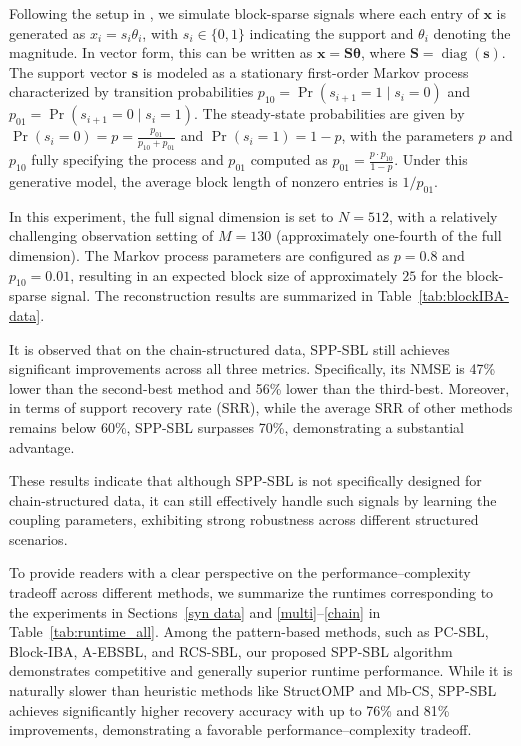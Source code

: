 \documentclass[lettersize,journal]{IEEEtran}
\theoremstyle{remark}
\begin{document}
Following the setup in \cite{korki2016iterative}, we simulate block-sparse signals where each entry of $\mathbf{x}$ is generated as $x_i = s_i \theta_i$, with $s_i \in \{0,1\}$ indicating the support and $\theta_i$ denoting the magnitude. In vector form, this can be written as $\mathbf{x} = \mathbf{S}\boldsymbol{\theta}$, where $\mathbf{S} = \operatorname{diag}(\mathbf{s})$. The support vector $\mathbf{s}$ is modeled as a stationary first-order Markov process characterized by transition probabilities $p_{10} = \Pr(s_{i+1}=1 \mid s_i=0)$ and $p_{01} = \Pr(s_{i+1}=0 \mid s_i=1)$. The steady-state probabilities are given by $\Pr(s_i=0) = p = \frac{p_{01}}{p_{10}+p_{01}}$ and $\Pr(s_i=1) = 1-p$, with the parameters $p$ and $p_{10}$ fully specifying the process and $p_{01}$ computed as $p_{01} = \frac{p \cdot p_{10}}{1-p}$.
Under this generative model, the average block length of nonzero entries is $1/p_{01}$. %

In this experiment, the full signal dimension is set to $N=512$, with a relatively challenging observation setting of $M=130$ (approximately one-fourth of the full dimension). The Markov process parameters are configured as $p=0.8$ and $p_{10}=0.01$, resulting in an expected block size of approximately $25$ for the block-sparse signal. %
The reconstruction results are summarized in Table~\ref{tab:blockIBA-data}.



It is observed that on the chain-structured data, SPP-SBL still achieves significant improvements across all three metrics. Specifically, its NMSE is 47\% lower than the second-best method and 56\% lower than the third-best. Moreover, in terms of support recovery rate (SRR), while the average SRR of other methods remains below 60\%, SPP-SBL surpasses 70\%, demonstrating a substantial advantage. 

These results indicate that although SPP-SBL is not specifically designed for chain-structured data, it can still effectively handle such signals by learning the coupling parameters, exhibiting strong robustness across different structured scenarios.

To provide readers with a clear perspective on the performance–complexity tradeoff across different methods, we summarize the runtimes corresponding to the experiments in Sections~\ref{syn data} and \ref{multi}–\ref{chain} in Table~\ref{tab:runtime_all}. Among the pattern-based methods, such as PC-SBL, Block-IBA, A-EBSBL, and RCS-SBL, our proposed SPP-SBL algorithm demonstrates competitive and generally superior runtime performance. While it is naturally slower than heuristic methods like StructOMP and Mb-CS, SPP-SBL achieves significantly higher recovery accuracy with up to 76\% and 81\% improvements, demonstrating a favorable performance–complexity tradeoff.
\end{document}
